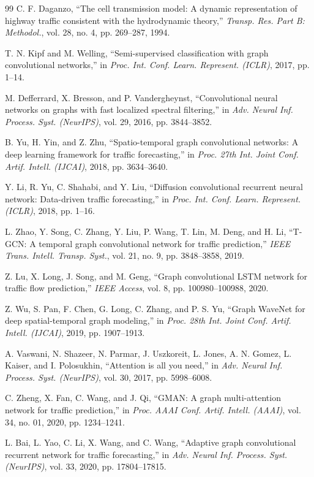 \documentclass[journal,twocolumn]{IEEEtran}
\begin{document}
\begin{thebibliography}{99}
C. F. Daganzo, ``The cell transmission model: A dynamic representation of highway traffic consistent with the hydrodynamic theory,'' \emph{Transp. Res. Part B: Methodol.}, vol. 28, no. 4, pp. 269--287, 1994.

T. N. Kipf and M. Welling, ``Semi-supervised classification with graph convolutional networks,'' in \emph{Proc. Int. Conf. Learn. Represent. (ICLR)}, 2017, pp. 1--14.

M. Defferrard, X. Bresson, and P. Vandergheynst, ``Convolutional neural networks on graphs with fast localized spectral filtering,'' in \emph{Adv. Neural Inf. Process. Syst. (NeurIPS)}, vol. 29, 2016, pp. 3844--3852.

B. Yu, H. Yin, and Z. Zhu, ``Spatio-temporal graph convolutional networks: A deep learning framework for traffic forecasting,'' in \emph{Proc. 27th Int. Joint Conf. Artif. Intell. (IJCAI)}, 2018, pp. 3634--3640.

Y. Li, R. Yu, C. Shahabi, and Y. Liu, ``Diffusion convolutional recurrent neural network: Data-driven traffic forecasting,'' in \emph{Proc. Int. Conf. Learn. Represent. (ICLR)}, 2018, pp. 1--16.

L. Zhao, Y. Song, C. Zhang, Y. Liu, P. Wang, T. Lin, M. Deng, and H. Li, ``T-GCN: A temporal graph convolutional network for traffic prediction,'' \emph{IEEE Trans. Intell. Transp. Syst.}, vol. 21, no. 9, pp. 3848--3858, 2019.

Z. Lu, X. Long, J. Song, and M. Geng, ``Graph convolutional LSTM network for traffic flow prediction,'' \emph{IEEE Access}, vol. 8, pp. 100980--100988, 2020.

Z. Wu, S. Pan, F. Chen, G. Long, C. Zhang, and P. S. Yu, ``Graph WaveNet for deep spatial-temporal graph modeling,'' in \emph{Proc. 28th Int. Joint Conf. Artif. Intell. (IJCAI)}, 2019, pp. 1907--1913.

A. Vaswani, N. Shazeer, N. Parmar, J. Uszkoreit, L. Jones, A. N. Gomez, L. Kaiser, and I. Polosukhin, ``Attention is all you need,'' in \emph{Adv. Neural Inf. Process. Syst. (NeurIPS)}, vol. 30, 2017, pp. 5998--6008.

C. Zheng, X. Fan, C. Wang, and J. Qi, ``GMAN: A graph multi-attention network for traffic prediction,'' in \emph{Proc. AAAI Conf. Artif. Intell. (AAAI)}, vol. 34, no. 01, 2020, pp. 1234--1241.

L. Bai, L. Yao, C. Li, X. Wang, and C. Wang, ``Adaptive graph convolutional recurrent network for traffic forecasting,'' in \emph{Adv. Neural Inf. Process. Syst. (NeurIPS)}, vol. 33, 2020, pp. 17804--17815.


\end{thebibliography}
\end{document}
